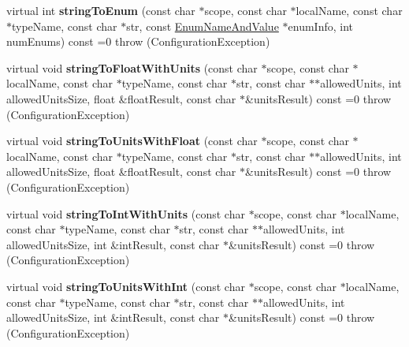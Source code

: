 \begin{DoxyCompactItemize}
\item 
\hypertarget{classCONFIG4CPP__NAMESPACE_1_1Configuration_a64718b9caddf3b07506aa11447708efe}{virtual int {\bfseries string\-To\-Enum} (const char $\ast$scope, const char $\ast$local\-Name, const char $\ast$type\-Name, const char $\ast$str, const \hyperlink{structCONFIG4CPP__NAMESPACE_1_1EnumNameAndValue}{Enum\-Name\-And\-Value} $\ast$enum\-Info, int num\-Enums) const =0  throw (\-Configuration\-Exception)}\label{classCONFIG4CPP__NAMESPACE_1_1Configuration_a64718b9caddf3b07506aa11447708efe}

\item 
\hypertarget{classCONFIG4CPP__NAMESPACE_1_1Configuration_aad3a6f150579d84401941d5cbf3cf0e7}{virtual void {\bfseries string\-To\-Float\-With\-Units} (const char $\ast$scope, const char $\ast$local\-Name, const char $\ast$type\-Name, const char $\ast$str, const char $\ast$$\ast$allowed\-Units, int allowed\-Units\-Size, float \&float\-Result, const char $\ast$\&units\-Result) const =0  throw (\-Configuration\-Exception)}\label{classCONFIG4CPP__NAMESPACE_1_1Configuration_aad3a6f150579d84401941d5cbf3cf0e7}

\item 
\hypertarget{classCONFIG4CPP__NAMESPACE_1_1Configuration_acca91fff8c2cd14d72bd37953697ada5}{virtual void {\bfseries string\-To\-Units\-With\-Float} (const char $\ast$scope, const char $\ast$local\-Name, const char $\ast$type\-Name, const char $\ast$str, const char $\ast$$\ast$allowed\-Units, int allowed\-Units\-Size, float \&float\-Result, const char $\ast$\&units\-Result) const =0  throw (\-Configuration\-Exception)}\label{classCONFIG4CPP__NAMESPACE_1_1Configuration_acca91fff8c2cd14d72bd37953697ada5}

\item 
\hypertarget{classCONFIG4CPP__NAMESPACE_1_1Configuration_a8f360ff006adbd573557344427d42f9f}{virtual void {\bfseries string\-To\-Int\-With\-Units} (const char $\ast$scope, const char $\ast$local\-Name, const char $\ast$type\-Name, const char $\ast$str, const char $\ast$$\ast$allowed\-Units, int allowed\-Units\-Size, int \&int\-Result, const char $\ast$\&units\-Result) const =0  throw (\-Configuration\-Exception)}\label{classCONFIG4CPP__NAMESPACE_1_1Configuration_a8f360ff006adbd573557344427d42f9f}

\item 
\hypertarget{classCONFIG4CPP__NAMESPACE_1_1Configuration_a9a11a56622c5be047b4e6a77164f854b}{virtual void {\bfseries string\-To\-Units\-With\-Int} (const char $\ast$scope, const char $\ast$local\-Name, const char $\ast$type\-Name, const char $\ast$str, const char $\ast$$\ast$allowed\-Units, int allowed\-Units\-Size, int \&int\-Result, const char $\ast$\&units\-Result) const =0  throw (\-Configuration\-Exception)}\label{classCONFIG4CPP__NAMESPACE_1_1Configuration_a9a11a56622c5be047b4e6a77164f854b}


\end{DoxyCompactItemize}
